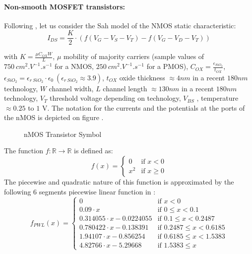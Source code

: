 \documentclass{article}
\def\geq{\geqslant}
\def\leq{\leqslant}
\begin{document}
\paragraph{Non-smooth MOSFET transistors:} Following \cite{leenaerts-bokhoven1998}, let us consider the Sah model of the NMOS static characteristic:
\begin{equation}
  \label{eq:MOS_LEE_VAN}
I_{DS} = \frac{K}{2} \cdot (f(V_G-V_S-V_T) - f(V_G-V_D-V_T))
\end{equation}


with $K = \frac{\mu C_{OX} W}{L}$, $\mu$ mobility of majority carriers (sample values of $750~cm^2.V^{-1}.s^{-1}$ for a NMOS, $250~cm^2.V^{-1}.s^{-1}$ for a PMOS), $C_{OX} = \frac{\epsilon_{SiO_2}}{t_{OX}}$, $\epsilon_{SiO_2} = \epsilon_{r~SiO_2} \cdot \epsilon_0 \ (\epsilon_{r~SiO_2} \approx 3.9)$, $t_{OX}$ oxide thickness $\approx 4 nm$ in a recent $180 nm$ technology, $W$ channel width, $L$ channel length $\approx 130 nm$ in a recent $180 nm$ technology, $V_T$ threshold voltage depending on technology, $V_{BS}$ , temperature $\approx 0.25$ to $1$ V. The notation for the currents and the potentials at the ports of the nMOS is depicted on figure \cite{fig:NMOS}. 

\begin{figure}
  \centering
  
  \caption{nMOS Transistor Symbol}
  \label{fig:NMOS}
\end{figure}


The function $f :\mathbb{R} \longrightarrow \mathbb{R}$ is defined as:
\[
f(x) = \left\{ \begin{array}{ll}
0 & \textrm{if $x < 0$}\\
x^2 & \textrm{if $x \geq 0$}
\end{array} \right.
\]
The piecewise and quadratic nature of this function is approximated by the following 6 segments piecewise linear
function in \cite{leenaerts-bokhoven1998}: 
\[
f_{PWL}(x) = \left\{ \begin{array}{ll}
0                            & \textrm{if $x < 0$}\\
0.09 \cdot x                 & \textrm{if $0 \leq x < 0.1$}\\
0.314055 \cdot x - 0.0224055 & \textrm{if $0.1 \leq x < 0.2487$}\\
0.780422 \cdot x - 0.138391  & \textrm{if $0.2487 \leq x < 0.6185$}\\
1.94107 \cdot x  - 0.856254  & \textrm{if $0.6185 \leq x < 1.5383$}\\
4.82766 \cdot x - 5.29668    & \textrm{if $1.5383 \leq x $}
\end{array} \right.
\]
\end{document}
